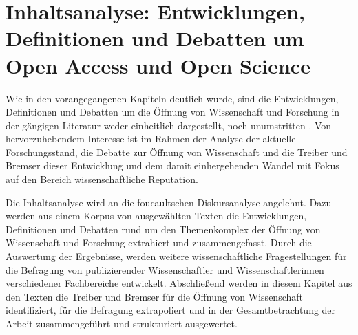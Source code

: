 \chapter{Inhaltsanalyse: Entwicklungen, Definitionen und Debatten um Open Access und Open Science}
Wie in den vorangegangenen Kapiteln deutlich wurde, sind die Entwicklungen, Definitionen und Debatten um die Öffnung von Wissenschaft und Forschung in der gängigen Literatur weder einheitlich dargestellt, noch unumstritten \cite{muller_2010_open} \cite{schulze_2013_open}. Von hervorzuhebendem Interesse ist im Rahmen der Analyse der aktuelle Forschungsstand, die Debatte zur Öffnung von Wissenschaft und die Treiber und Bremser dieser Entwicklung und dem damit einhergehenden Wandel mit Fokus auf den Bereich wissenschaftliche Reputation.

Die Inhaltsanalyse wird an die foucaultschen Diskursanalyse angelehnt. Dazu werden aus einem Korpus von ausgewählten Texten die Entwicklungen, Definitionen und Debatten rund um den Themenkomplex der Öffnung von Wissenschaft und Forschung extrahiert und zusammengefasst. Durch die Auswertung der Ergebnisse, werden weitere wissenschaftliche Fragestellungen für die Befragung von publizierender Wissenschaftler und Wissenschaftlerinnen verschiedener Fachbereiche entwickelt. Abschließend werden in diesem Kapitel aus den Texten die Treiber und Bremser für die Öffnung von Wissenschaft identifiziert, für die Befragung extrapoliert und in der Gesamtbetrachtung der Arbeit zusammengeführt und strukturiert ausgewertet.

